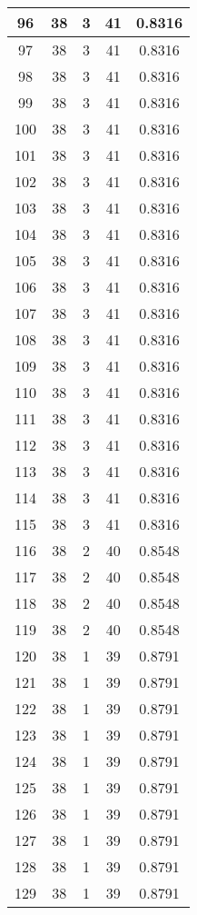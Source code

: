\documentclass[letterpaper, 12pt]{article}
\begin{document}
\begin{longtable}{|c|c|c|c|c|}
\hline
96 & 38 & 3 & 41 & 0.8316 \\
\hline
97 & 38 & 3 & 41 & 0.8316 \\
\hline
98 & 38 & 3 & 41 & 0.8316 \\
\hline
99 & 38 & 3 & 41 & 0.8316 \\
\hline
100 & 38 & 3 & 41 & 0.8316 \\
\hline
101 & 38 & 3 & 41 & 0.8316 \\
\hline
102 & 38 & 3 & 41 & 0.8316 \\
\hline
103 & 38 & 3 & 41 & 0.8316 \\
\hline
104 & 38 & 3 & 41 & 0.8316 \\
\hline
105 & 38 & 3 & 41 & 0.8316 \\
\hline
106 & 38 & 3 & 41 & 0.8316 \\
\hline
107 & 38 & 3 & 41 & 0.8316 \\
\hline
108 & 38 & 3 & 41 & 0.8316 \\
\hline
109 & 38 & 3 & 41 & 0.8316 \\
\hline
110 & 38 & 3 & 41 & 0.8316 \\
\hline
111 & 38 & 3 & 41 & 0.8316 \\
\hline
112 & 38 & 3 & 41 & 0.8316 \\
\hline
113 & 38 & 3 & 41 & 0.8316 \\
\hline
114 & 38 & 3 & 41 & 0.8316 \\
\hline
115 & 38 & 3 & 41 & 0.8316 \\
\hline
116 & 38 & 2 & 40 & 0.8548 \\
\hline
117 & 38 & 2 & 40 & 0.8548 \\
\hline
118 & 38 & 2 & 40 & 0.8548 \\
\hline
119 & 38 & 2 & 40 & 0.8548 \\
\hline
120 & 38 & 1 & 39 & 0.8791 \\
\hline
121 & 38 & 1 & 39 & 0.8791 \\
\hline
122 & 38 & 1 & 39 & 0.8791 \\
\hline
123 & 38 & 1 & 39 & 0.8791 \\
\hline
124 & 38 & 1 & 39 & 0.8791 \\
\hline
125 & 38 & 1 & 39 & 0.8791 \\
\hline
126 & 38 & 1 & 39 & 0.8791 \\
\hline
127 & 38 & 1 & 39 & 0.8791 \\
\hline
128 & 38 & 1 & 39 & 0.8791 \\
\hline
129 & 38 & 1 & 39 & 0.8791 \\

\end{longtable}
\end{document}
